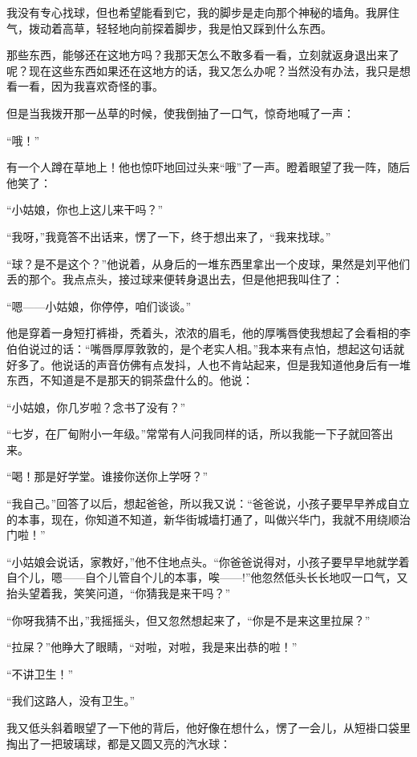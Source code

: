 \par 我没有专心找球，但也希望能看到它，我的脚步是走向那个神秘的墙角。我屏住气，拨动着高草，轻轻地向前探着脚步，我是怕又踩到什么东西。
\par 那些东西，能够还在这地方吗？我那天怎么不敢多看一看，立刻就返身退出来了呢？现在这些东西如果还在这地方的话，我又怎么办呢？当然没有办法，我只是想看一看，因为我喜欢奇怪的事。
\par 但是当我拨开那一丛草的时候，使我倒抽了一口气，惊奇地喊了一声：
\par “哦！”
\par 有一个人蹲在草地上！他也惊吓地回过头来“哦”了一声。瞪着眼望了我一阵，随后他笑了：
\par “小姑娘，你也上这儿来干吗？”
\par “我呀，”我竟答不出话来，愣了一下，终于想出来了，“我来找球。”
\par “球？是不是这个？”他说着，从身后的一堆东西里拿出一个皮球，果然是刘平他们丢的那个。我点点头，接过球来便转身退出去，但是他把我叫住了：
\par “嗯——小姑娘，你停停，咱们谈谈。”
\par 他是穿着一身短打裤褂，秃着头，浓浓的眉毛，他的厚嘴唇使我想起了会看相的李伯伯说过的话：“嘴唇厚厚敦敦的，是个老实人相。”我本来有点怕，想起这句话就好多了。他说话的声音仿佛有点发抖，人也不肯站起来，但是我知道他身后有一堆东西，不知道是不是那天的铜茶盘什么的。他说：
\par “小姑娘，你几岁啦？念书了没有？”
\par “七岁，在厂甸附小一年级。”常常有人问我同样的话，所以我能一下子就回答出来。
\par “喝！那是好学堂。谁接你送你上学呀？”
\par “我自己。”回答了以后，想起爸爸，所以我又说：“爸爸说，小孩子要早早养成自立的本事，现在，你知道不知道，新华街城墙打通了，叫做兴华门，我就不用绕顺治门啦！”
\par “小姑娘会说话，家教好，”他不住地点头。“你爸爸说得对，小孩子要早早地就学着自个儿，嗯——自个儿管自个儿的本事，唉——!”他忽然低头长长地叹一口气，又抬头望着我，笑笑问道，“你猜我是来干吗？”
\par “你呀我猜不出，”我摇摇头，但又忽然想起来了，“你是不是来这里拉屎？”
\par “拉屎？”他睁大了眼睛，“对啦，对啦，我是来出恭的啦！”
\par “不讲卫生！”
\par “我们这路人，没有卫生。”
\par 我又低头斜着眼望了一下他的背后，他好像在想什么，愣了一会儿，从短褂口袋里掏出了一把玻璃球，都是又圆又亮的汽水球：
